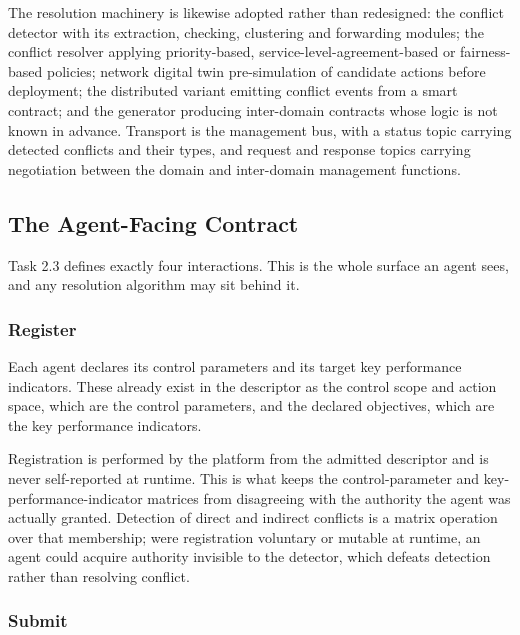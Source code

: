 The resolution machinery is likewise adopted rather than redesigned: the
conflict detector with its extraction, checking, clustering and
forwarding modules; the conflict resolver applying priority-based,
service-level-agreement-based or fairness-based policies; network
digital twin pre-simulation of candidate actions before deployment; the
distributed variant emitting conflict events from a smart contract; and
the generator producing inter-domain contracts whose logic is not known
in advance. Transport is the management bus, with a status topic
carrying detected conflicts and their types, and request and response
topics carrying negotiation between the domain and inter-domain
management functions.

\hypertarget{the-agent-facing-contract}{%
\subsection{The Agent-Facing Contract}\label{the-agent-facing-contract}}

Task 2.3 defines exactly four interactions. This is the whole surface an
agent sees, and any resolution algorithm may sit behind it.

\hypertarget{register}{%
\subsubsection{Register}\label{register}}

Each agent declares its control parameters and its target key
performance indicators. These already exist in the descriptor as the
control scope and action space, which are the control parameters, and
the declared objectives, which are the key performance indicators.

Registration is performed by the platform from the admitted descriptor
and is never self-reported at runtime. This is what keeps the
control-parameter and key-performance-indicator matrices from
disagreeing with the authority the agent was actually granted. Detection
of direct and indirect conflicts is a matrix operation over that
membership; were registration voluntary or mutable at runtime, an agent
could acquire authority invisible to the detector, which defeats
detection rather than resolving conflict.

\hypertarget{submit}{%
\subsubsection{Submit}\label{submit}}

